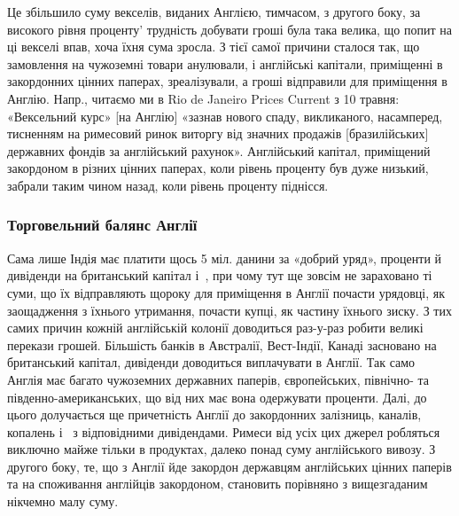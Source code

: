 \parcont{}  %
Це збільшило суму векселів, виданих Англією, тимчасом, з другого боку, за
високого рівня проценту' трудність добувати гроші була така велика, що попит
на ці векселі впав, хоча їхня сума зросла. З тієї самої причини сталося так,
що замовлення на чужоземні товари анулювали, і англійські капітали, приміщенні
в закордонних цінних паперах, зреалізували, а гроші відправили для
приміщення в Англію. Напр., читаємо ми в Rio de Janeiro Prices Current з 10
травня: «Вексельний курс» [на Англію] «зазнав нового спаду, викликаного,
насамперед, тисненням на римесовий ринок виторгу від значних продажів [бразилійських]
державних фондів за англійський рахунок». Англійський капітал, приміщений
закордоном в різних цінних паперах, коли рівень проценту був дуже
низький, забрали таким чином назад, коли рівень проценту піднісся.

\subsubsection{Торговельний балянс Англії}

Сама лише Індія має платити щось 5 міл. данини за «добрий уряд»,
проценти й дивіденди на британський капітал і~, при чому тут ще зовсім
не зараховано ті суми, що їх відправляють щороку для приміщення в Англії
почасти урядовці, як заощадження з їхнього утримання, почасти купці, як частину
їхнього зиску. З тих самих причин кожній англійській колонії доводиться
раз-у-раз робити великі перекази грошей. Більшість банків в Австралії, Вест-Індії,
Канаді засновано на британський капітал, дивіденди доводиться виплачувати
в Англії. Так само Англія має багато чужоземних державних паперів, європейських,
північно- та південно-американських, що від них має вона одержувати
проценти. Далі, до цього долучається ще причетність Англії до закордонних
залізниць, каналів, копалень і~ з відповідними дивідендами. Римеси від
усіх цих джерел робляться виключно майже тільки в продуктах, далеко понад
суму англійського вивозу. З другого боку, те, що з Англії йде закордон державцям
англійських цінних паперів та на споживання англійців закордоном, становить
порівняно з вищезгаданим нікчемно малу суму.


